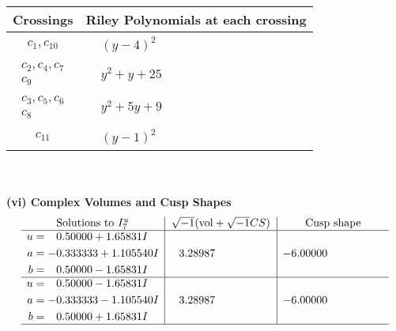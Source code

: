 \documentclass[1p]{elsarticle_modified}
\theoremstyle{definition}
\newcommand{\I}{\sqrt{-1}}
\begin{document}
\begin{tabular}{m{50pt}|m{274pt}}
Crossings & \hspace{64pt}Riley Polynomials at each crossing \\
\hline $$\begin{aligned}c_{1},c_{10}\end{aligned}$$&$\begin{aligned}
&(y-4)^2
\end{aligned}$\\
\hline $$\begin{aligned}c_{2},c_{4},c_{7}\\c_{9}\end{aligned}$$&$\begin{aligned}
&y^2+y+25
\end{aligned}$\\
\hline $$\begin{aligned}c_{3},c_{5},c_{6}\\c_{8}\end{aligned}$$&$\begin{aligned}
&y^2+5 y+9
\end{aligned}$\\
\hline $$\begin{aligned}c_{11}\end{aligned}$$&$\begin{aligned}
&(y-1)^2
\end{aligned}$\\
\hline
\end{tabular}\\~\\
\newpage\flushleft \textbf{(vi) Complex Volumes and Cusp Shapes}
$$\begin{array}{c|c|c}  
\text{Solutions to }I^u_{7}& \I (\text{vol} + \sqrt{-1}CS) & \text{Cusp shape}\\
 \hline 
\begin{aligned}
u &= \phantom{-}0.50000 + 1.65831 I \\
a &= -0.333333 + 1.105540 I \\
b &= \phantom{-}0.50000 - 1.65831 I\end{aligned}
 & \phantom{-}3.28987\phantom{ +0.000000I} & -6.00000\phantom{ +0.000000I} \\ \hline\begin{aligned}
u &= \phantom{-}0.50000 - 1.65831 I \\
a &= -0.333333 - 1.105540 I \\
b &= \phantom{-}0.50000 + 1.65831 I\end{aligned}
 & \phantom{-}3.28987\phantom{ +0.000000I} & -6.00000\phantom{ +0.000000I}\\
 \hline 
 \end{array}$$\newpage\newpage\renewcommand{\arraystretch}{1}
\end{document}
